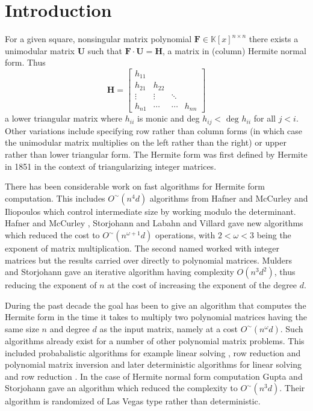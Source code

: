 
\section{Introduction}

For a given square, nonsingular matrix polynomial $\mathbf{F}\in\mathbb{K}[x]^{n\times n}$
there exists a unimodular matrix $\mathbf{U}$ such that $\mathbf{F}\cdot\mathbf{U}=\mathbf{H}$,
a matrix in (column) Hermite normal form. Thus 
\[
\mathbf{H}=\left[\begin{array}{cccc}
h_{11}\\
h_{21} & h_{22}\\
\vdots & \vdots & \ddots\\
h_{n1} & \cdots & \cdots & h_{nn}
\end{array}\right]
\]
 a lower triangular matrix where $h_{ii}$ is monic and deg $h_{ij}<\mbox{ deg }h_{ii}$
for all $j<i$. Other variations include specifying row rather than
column forms (in which case the unimodular matrix multiplies on the
left rather than the right) or upper rather than lower triangular
form. The Hermite form was first defined by Hermite in 1851 in the
context of triangularizing integer matrices.

There has been considerable work on fast algorithms for Hermite form
computation. This includes $O^{\sim}\left(n^{4}d\right)$ algorithms
from Hafner and McCurley \citet{hafner} and Iliopoulos \citet{iliopoulos}
which control intermediate size by working modulo the determinant.
Hafner and McCurley \citet{hafner}, Storjohann and Labahn \citet{storjohann-labahn96}
and Villard \citet{villard96} gave new algorithms which reduced the
cost to $O^{\sim}\left(n^{\omega+1}d\right)$ operations, with $2<\omega<3$
being the exponent of matrix multiplication. The second named worked
with integer matrices but the results carried over directly to polynomial
matrices. Mulders and Storjohann \citet{mulders-storjohann:2003}
gave an iterative algorithm having complexity $O\left(n^{3}d^{2}\right)$,
thus reducing the exponent of $n$ at the cost of increasing the exponent
of the degree $d$.

During the past decade the goal has been to give an algorithm that
computes the Hermite form in the time it takes to multiply two polynomial
matrices having the same size $n$ and degree $d$ as the input matrix,
namely at a cost $O^{\sim}\left(n^{\omega}d\right)$. Such algorithms
already exist for a number of other polynomial matrix problems. This
included probabalistic algorithms for example linear solving \citet{mulders-storjohann:2003},
row reduction \citet{Giorgi2003} and polynomial matrix inversion
\citet{jeannerod-villard:05} and later deterministic algorithms for
linear solving and row reduction \citet{GSSV2012}. In the case of
Hermite normal form computation Gupta and Storjohann \citet{GS2011}
gave an algorithm which reduced the complexity to $O^{\sim}\left(n^{3}d\right)$.
Their algorithm is randomized of Las Vegas type rather than deterministic.

